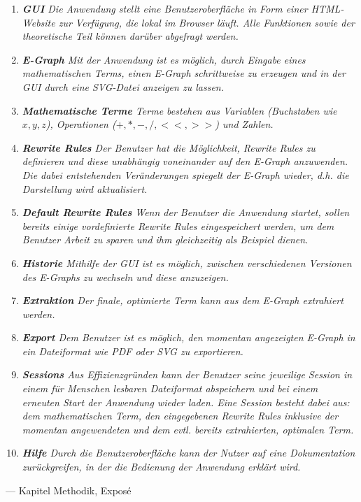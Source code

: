 \begin{tcolorbox}[enhanced, frame hidden, borderline west = {1.5pt}{0pt}{gray-700},lower separated=false,fontupper=\sffamily]
\begin{enumerate}[topsep=0pt,itemsep=-0.5ex,partopsep=1ex,parsep=1ex]
    \item {\sffamily\itshape \textbf{GUI} Die Anwendung stellt eine Benutzeroberfläche in Form einer HTML-Website zur Verfügung, die lokal im Browser läuft.
        Alle Funktionen sowie der theoretische Teil können darüber abgefragt werden.}
    \item {\sffamily\itshape \textbf{E-Graph} Mit der Anwendung ist es möglich, durch Eingabe eines mathematischen Terms, einen E-Graph schrittweise zu erzeugen und in der GUI durch eine SVG-Datei anzeigen zu lassen.}
    \item {\sffamily\itshape \textbf{Mathematische Terme} Terme bestehen aus Variablen (Buchstaben wie $x, y, z$), Operationen ($+, *, -, /, <<, >>$) und Zahlen.}
    \item {\sffamily\itshape \textbf{Rewrite Rules} Der Benutzer hat die Möglichkeit, Rewrite Rules zu definieren und diese unabhängig voneinander auf den E-Graph anzuwenden. Die dabei entstehenden
        Veränderungen spiegelt der E-Graph wieder, d.h. die Darstellung wird aktualisiert.}
    \item {\sffamily\itshape \textbf{Default Rewrite Rules} Wenn der Benutzer die Anwendung startet, sollen bereits einige vordefinierte Rewrite Rules eingespeichert werden, um dem Benutzer Arbeit zu sparen und
        ihm gleichzeitig als Beispiel dienen.}
    \item {\sffamily\itshape \textbf{Historie} Mithilfe der GUI ist es möglich, zwischen verschiedenen Versionen des E-Graphs zu wechseln und diese anzuzeigen.}
    \item {\sffamily\itshape \textbf{Extraktion} Der finale, optimierte Term kann aus dem E-Graph extrahiert werden.}
    \item {\sffamily\itshape \textbf{Export} Dem Benutzer ist es möglich, den momentan angezeigten E-Graph in ein Dateiformat wie PDF oder SVG zu exportieren.}
    \item {\sffamily\itshape \textbf{Sessions} Aus Effizienzgründen kann der Benutzer seine jeweilige Session in einem für Menschen lesbaren Dateiformat abspeichern und bei einem erneuten Start der Anwendung wieder
        laden. Eine Session besteht dabei aus: dem mathematischen Term, den eingegebenen Rewrite Rules inklusive der momentan angewendeten und dem evtl. bereits extrahierten, optimalen Term.}
    \item{\sffamily\itshape \textbf{Hilfe} Durch die Benutzeroberfläche kann der Nutzer auf eine Dokumentation zurückgreifen, in der die Bedienung der Anwendung erklärt wird.}
\end{enumerate}\vspace{-2mm}
    
\begin{flushright}
    --- Kapitel Methodik, Exposé
\end{flushright}
\end{tcolorbox}

